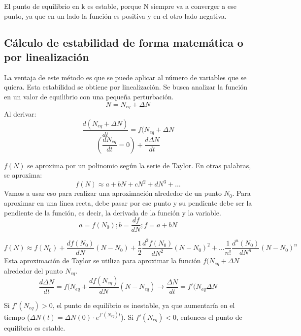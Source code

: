 El punto de equilibrio en k es estable, porque N siempre va a converger a ese punto, ya que en un lado la función es positiva y en el otro lado negativa.

\subsection{Cálculo de estabilidad de forma matemática o por linealización}
La ventaja de este método es que se puede aplicar al número de variables que se quiera. Esta estabilidad se obtiene por linealización. 
Se busca analizar la función en un valor de equilibrio con una pequeña perturbación. 
$$N = N_{eq} + \Delta N$$
Al derivar:
$$\frac{d(N_{eq} + \Delta N)}{dt} = f(N_{eq} + \Delta N$$
$$(\frac{dN_{eq}}{dt} = 0) + \frac{d \Delta N}{dt}$$

$f(N)$ se aproxima por un polinomio según la serie de Taylor. En otras palabras, se aproxima:
$$f(N) \approx a + bN + cN^2 + dN^3 + \ldots$$ 
Vamos a usar eso para realizar una aproximación alrededor de un punto $N_0$. Para aproximar en una línea recta, debe pasar por ese punto y su pendiente debe ser la pendiente de la función, es decir, la derivada de la función y la variable.
$$a = f(N_0); b = \frac{df}{dN}; f = a + bN$$

$$f(N) \approx f(N_0) + \frac{df(N_0)}{dN} (N-N_0) + \frac{1}{2} \frac{d^2f(N_0)}{dN^2} (N-N_0)^2 + \ldots \frac{1}{n!} \frac{d^n(N_0)}{dN^n}(N-N_0)^n$$
Esta aproximación de Taylor se utiliza para aproximar la función $f(N_{eq} + \Delta N$ alrededor del punto $N_{eq}$. 
$$\frac{d \Delta N}{dt} = f(N_{eq} + \frac{df(N_{eq})}{dN} (N-N_{eq}) \rightarrow \frac{\Delta N}{dt} = f'(N_{eq} \Delta N$$

Si $f'(N_{eq}) > 0$, el punto de equilibrio es inestable, ya que aumentaría en el tiempo ($\Delta N(t) = \Delta N(0) \cdot e^{f'(N_{eq}) t}$). Si $f'(N_{eq}) < 0$, entonces el punto de equilibrio es estable.

